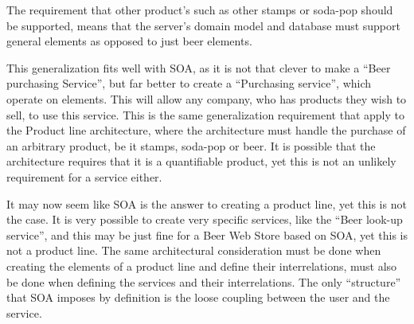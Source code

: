 The requirement that other product's such as other stamps or soda-pop should be supported, means that the server's domain model and database must support general elements as opposed to just beer elements.

This generalization fits well with SOA, as it is not that clever to make a ``Beer purchasing Service'', but far better to create a ``Purchasing service'', which operate on elements. This will allow any company, who has products they wish to sell, to use this service. This is the same generalization requirement that apply to the Product line architecture, where the architecture must handle the purchase of an arbitrary product, be it stamps, soda-pop or beer. It is possible that the architecture requires that it is a quantifiable product, yet this is not an unlikely requirement for a service either.

It may now seem like SOA is the answer to creating a product line, yet this is not the case. It is very possible to create very specific services, like the ``Beer look-up service'', and this may be just fine for a Beer Web Store based on SOA, yet this is not a product line. The same architectural consideration must be done when creating the elements of a product line and define their interrelations, must also be done when defining the services and their interrelations. The only ``structure'' that SOA imposes by definition is the loose coupling between the user and the service.
